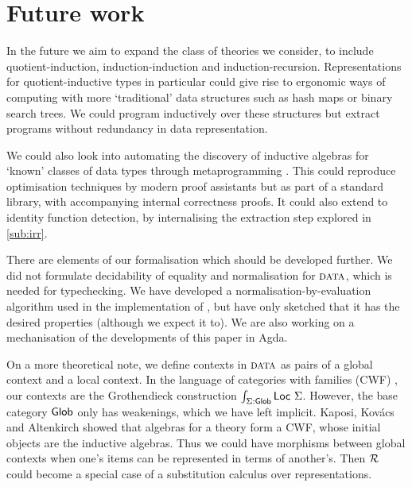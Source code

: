 
\section{Future work}


In the future we aim to expand the class of theories we consider, to include
quotient-induction, induction-induction and induction-recursion. Representations
for quotient-inductive types in particular could give rise to ergonomic ways of
computing with more `traditional' data structures such as hash maps or binary
search trees. We could program inductively over these structures but extract
programs without redundancy in data representation.

We could also look into automating the discovery of inductive algebras for
`known' classes of data types through metaprogramming \cite{Dagand2017-nj}. This
could reproduce optimisation techniques by modern proof assistants but as
part of a standard library, with accompanying internal correctness proofs. It
could also extend to identity function detection, by internalising the
extraction step explored in \cref{sub:irr}.

There are elements of our formalisation which should be developed further. We
did not formulate decidability of equality and normalisation for ${\textsc{data}}$,
which is needed for typechecking. We have developed a
normalisation-by-evaluation \cite{Altenkirch2020-rm} algorithm used in the
implementation of \superfluid, but have only sketched that it has the
desired properties (although we expect it to). We are also working on a
mechanisation of the developments of this paper in Agda.



On a more theoretical note, we define contexts in ${\textsc{data}}$ as pairs of a
global context and a local context. In the language of categories with
families (CWF) \cite{Castellan2019-qo}, our contexts are the Grothendieck
construction $\int _{\Sigma : \textsf{Glob}} \textsf{Loc}\ \Sigma$. However, the base
category $\textsf{Glob}$ only has weakenings, which we have left implicit.
Kaposi, Kov\'acs and Altenkirch \cite{Kaposi2019-pj} showed that algebras for a
theory form a CWF, whose initial objects are the inductive algebras. Thus we
could have morphisms between global contexts when one's items can be represented
in terms of another's. Then $\mathcal{R}$ could become a special case of a substitution
calculus over representations.

